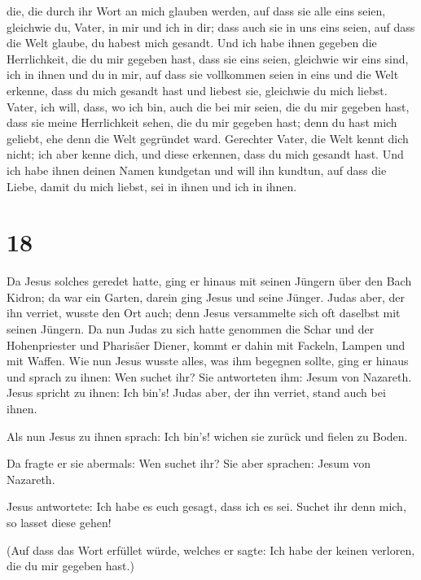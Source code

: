 die, die durch ihr Wort an mich glauben werden,  auf dass
sie alle eins seien, gleichwie du, Vater, in mir und ich in dir; dass
auch sie in uns eins seien, auf dass die Welt glaube, du habest mich
gesandt.  Und ich habe ihnen gegeben die Herrlichkeit,
die du mir gegeben hast, dass sie eins seien, gleichwie wir eins sind,
 ich in ihnen und du in mir, auf dass sie vollkommen
seien in eins und die Welt erkenne, dass du mich gesandt hast und
liebest sie, gleichwie du mich liebst.  Vater, ich will,
dass, wo ich bin, auch die bei mir seien, die du mir gegeben hast, dass
sie meine Herrlichkeit sehen, die du mir gegeben hast; denn du hast mich
geliebt, ehe denn die Welt gegründet ward.  Gerechter
Vater, die Welt kennt dich nicht; ich aber kenne dich, und diese
erkennen, dass du mich gesandt hast.  Und ich habe ihnen
deinen Namen kundgetan und will ihn kundtun, auf dass die Liebe, damit
du mich liebst, sei in ihnen und ich in ihnen.

\hypertarget{section-17}{%
\section{18}\label{section-17}}

 Da Jesus solches geredet hatte, ging er hinaus mit seinen
Jüngern über den Bach Kidron; da war ein Garten, darein ging Jesus und
seine Jünger.  Judas aber, der ihn verriet, wusste den Ort
auch; denn Jesus versammelte sich oft daselbst mit seinen Jüngern.
 Da nun Judas zu sich hatte genommen die Schar und der
Hohenpriester und Pharisäer Diener, kommt er dahin mit Fackeln, Lampen
und mit Waffen.  Wie nun Jesus wusste alles, was ihm
begegnen sollte, ging er hinaus und sprach zu ihnen: Wen suchet ihr?
 Sie antworteten ihm: Jesum von Nazareth. Jesus spricht zu
ihnen: Ich bin's! Judas aber, der ihn verriet, stand auch bei ihnen.

 Als nun Jesus zu ihnen sprach: Ich bin's! wichen sie
zurück und fielen zu Boden.

 Da fragte er sie abermals: Wen suchet ihr? Sie aber
sprachen: Jesum von Nazareth.

 Jesus antwortete: Ich habe es euch gesagt, dass ich es
sei. Suchet ihr denn mich, so lasset diese gehen!

 (Auf dass das Wort erfüllet würde, welches er sagte: Ich
habe der keinen verloren, die du mir gegeben hast.)

